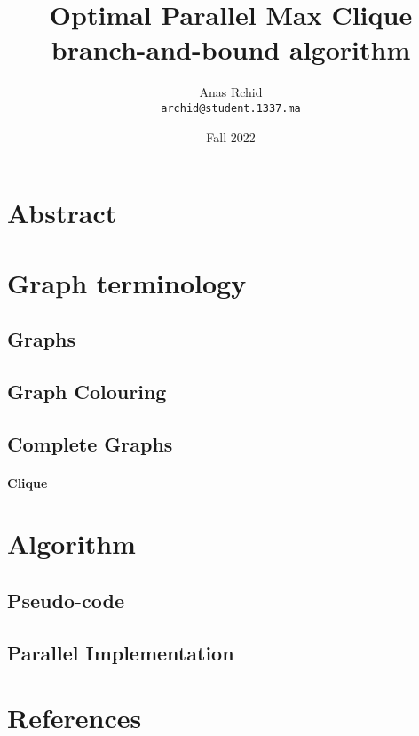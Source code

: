 \documentclass[•]{article}
\title{Optimal Parallel Max Clique branch-and-bound algorithm}
\author{Anas Rchid\\ \texttt{archid@student.1337.ma}}
\date{Fall 2022}
\begin{document}
\maketitle

\section*{Abstract}

\section{Graph terminology}

\subsection{Graphs}

\subsection{Graph Colouring}

\subsection{Complete Graphs}
\paragraph{Clique}

\section{Algorithm}

\subsection{Pseudo-code}

\subsection{Parallel Implementation}

\section{References}
\end{document}
